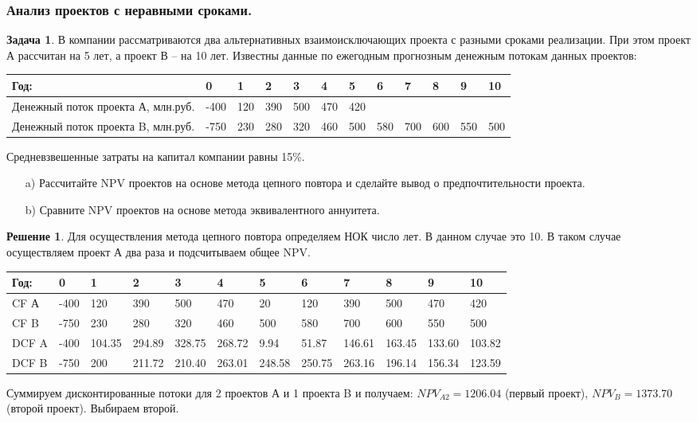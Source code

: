 \documentclass[a4paper, 14pt]{article}
\theoremstyle{plain} %
\theoremstyle{definition} %
\newtheorem*{solution}{Решение}
\newtheorem{problem}{Задача}[subsection]
\theoremstyle{remark} %
\begin{document}
\subsubsection{Анализ проектов с неравными сроками.}
\begin{problem}
	В компании рассматриваются два альтернативных взаимоисключающих проекта с разными сроками реализации. При этом проект А рассчитан на 5 лет, а проект В – на 10 лет. Известны данные по ежегодным прогнозным денежным потокам данных проектов:
\begin{center}
\begin{tabular}[0.88\textwidth]{|p{4cm}|l|l|l|l|l|l|l|l|l|l|l|}
\hline
Год:                               & 0    & 1   & 2   & 3   & 4   & 5   & 6   & 7   & 8   & 9   & 10   \\
\hline
Денежный поток проекта А, млн.руб. & -400 & 120 & 390 & 500 & 470 & 420 &     &     &     &     &      \\
\hline
Денежный поток проекта B, млн.руб. & -750 & 230 & 280 & 320 & 460 & 500 & 580 & 700 & 600 & 550 & 500  \\
\hline
\end{tabular}
\end{center}

Средневзвешенные затраты на капитал компании равны 15\%.
\begin{itemize}
	\item[a)] Рассчитайте NPV проектов на основе метода цепного повтора и сделайте вывод о предпочтительности проекта.
	\item[b)] Сравните NPV проектов на основе метода эквивалентного аннуитета.
\end{itemize}
	\begin{solution}
		Для осуществления метода цепного повтора определяем НОК число лет. В данном случае это 10. В таком случае осуществляем проект А два раза и подсчитываем общее NPV.
\begin{center}
\begin{tabular}[0.6\textwidth]{|p{0.74cm}|l|l|l|l|l|l|l|l|l|l|l|}
\hline
Год:                               & 0       & 1      & 2      & 3      & 4      & 5      & 6      & 7      & 8      & 9      & 10      \\
\hline
CF А & -400    & 120    & 390    & 500    & 470    & 20     & 120    & 390    & 500    & 470    & 420     \\
\hline
CF B & -750    & 230    & 280    & 320    & 460    & 500    & 580    & 700    & 600    & 550    & 500     \\
\hline
DCF A                      & -400    & 104.35 & 294.89 & 328.75 & 268.72 & 9.94   & 51.87  & 146.61 & 163.45 & 133.60 & 103.82  \\
\hline
DCF B                      & -750    & 200    & 211.72 & 210.40 & 263.01 & 248.58 & 250.75 & 263.16 & 196.14 & 156.34 & 123.59  \\
\hline
\end{tabular}
\end{center}
Суммируем дисконтированные потоки для 2 проектов А и 1 проекта B и получаем: $NPV_{A2} = 1206.04$ (первый проект), $NPV_{B} = 1373.70$ (второй проект). Выбираем второй.


\end{solution}
\end{problem}
\end{document}
